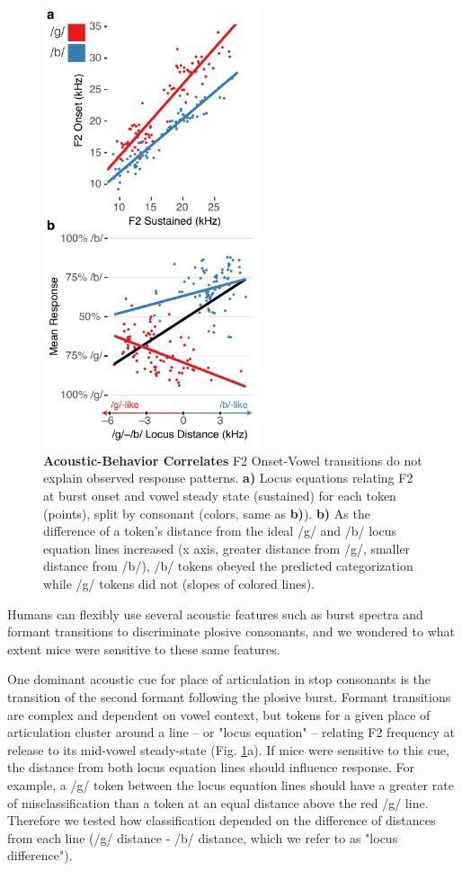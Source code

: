 \begin{figure}[!t]
\includegraphics[width=2.5in]{speech/figures/Figure5.pdf}
\caption{\textbf{Acoustic-Behavior Correlates} F2 Onset-Vowel transitions do not explain observed response patterns. \textbf{a)} Locus equations relating F2 at burst onset and vowel steady state (sustained) for each token (points), split by consonant (colors, same as \textbf{b)}). \textbf{b)} As the difference of a token's distance from the ideal /g/ and /b/ locus equation lines increased (x axis, greater distance from /g/, smaller distance from /b/), /b/ tokens obeyed the predicted categorization while /g/ tokens did not (slopes of colored lines). }
\label{acoustic}
\end{figure}

Humans can flexibly use several acoustic features such as burst spectra and formant transitions to discriminate plosive consonants, and we wondered to what extent mice were sensitive to these same features.

One dominant acoustic cue for place of articulation in stop consonants is the transition of the second formant following the plosive burst\cite{Wright2004,Sussman1998,Lindblom2012}. Formant transitions are complex and dependent on vowel context, but tokens for a given place of articulation cluster around a line -- or "locus equation" -- relating F2 frequency at release to its mid-vowel steady-state\cite{Sussman1998,Lindblom2012} (Fig. \ref{acoustic}a).  If mice were sensitive to this cue, the distance from both locus equation lines should influence response. For example, a /g/ token between the locus equation lines should have a greater rate of misclassification than a token at an equal distance above the red /g/ line. Therefore we tested how classification depended on the difference of distances from each line (/g/ distance - /b/ distance, which we refer to as "locus difference").

